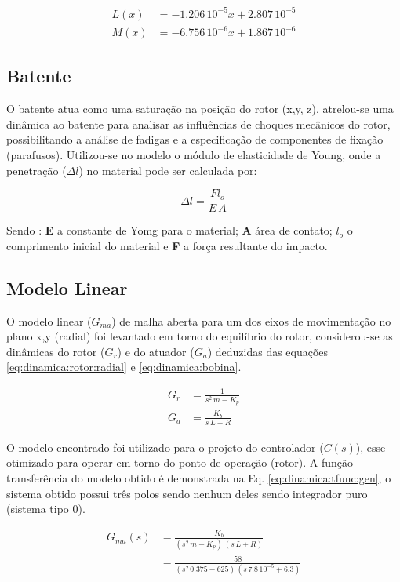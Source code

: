 \begin{align}
	L(x) &= -1.206 \,10^{-5} x + 2.807 \, 10^{-5} \\
	M(x) &= -6.756 \,10^{-6} x + 1.867 \, 10^{-6} 
	\label{eq:indutancias:aprox}
\end{align} 

\subsection{Batente}

O batente atua como uma saturação na posição do rotor (x,y, z), atrelou-se uma dinâmica ao batente para analisar as influências de choques mecânicos do rotor, possibilitando a análise de fadigas e a especificação de componentes de fixação (parafusos). Utilizou-se no  modelo o módulo de elasticidade de Young, onde a penetração ($\Delta l $) no material pode ser calculada por:

\begin{equation}
	\Delta l =  \frac{F l_o}{E \, A}
\end{equation}

Sendo : \textbf{E }a constante de Yomg para o material; \textbf{A} área de contato; \textbf{$l_o$ } o comprimento inicial do material e \textbf{F} a força resultante do impacto. 


\subsection{Modelo Linear}

O modelo linear ($G_{ma}$) de malha aberta para um dos eixos de movimentação no plano x,y (radial) foi levantado em torno do equilíbrio do rotor, considerou-se as dinâmicas do rotor ($G_r$) e do atuador ($G_a$) deduzidas das equações  \eqref{eq:dinamica:rotor:radial} e \eqref{eq:dinamica:bobina}.

\begin{align}
	G_r &= \frac{1}{s^2 \, m - K_p} \\
	G_a &= \frac{K_b}{s\, L + R}
\end{align}

O modelo encontrado foi utilizado para o projeto do controlador ($C(s)$), esse otimizado para operar em torno do ponto de operação (rotor). A função transferência do modelo obtido é demonstrada na Eq. \eqref{eq:dinamica:tfunc:gen}, o sistema obtido possui três polos sendo nenhum deles sendo integrador puro (sistema tipo 0).  

\begin{align}
	G_{ma}(s) &= \frac{K_b}{(s^2 \, m - K_p) \, (s\, L + R)}	\label{eq:dinamica:tfunc:gen} \\
	&= \frac{58}{(s^2 \, 0.375 - 625) \, (s\, 7.8 \, 10^{-5} + 6.3)}
	 \label{eq:dinamica:tfunc}
\end{align}
 

